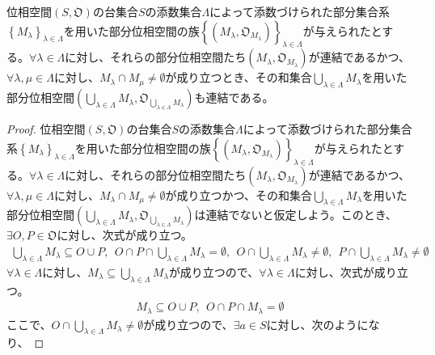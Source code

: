 \documentclass[dvipdfmx]{jsarticle}
\begin{document}
\begin{thm}\label{8.1.5.6}
位相空間$\left( S,\mathfrak{O} \right)$の台集合$S$の添数集合$\varLambda$によって添数づけられた部分集合系$\left\{ M_{\lambda} \right\}_{\lambda \in \varLambda}$を用いた部分位相空間の族$\left\{ \left( M_{\lambda},\mathfrak{O}_{M_{\lambda}} \right) \right\}_{\lambda \in \varLambda}$が与えられたとする。$\forall\lambda \in \varLambda$に対し、それらの部分位相空間たち$\left( M_{\lambda},\mathfrak{O}_{M_{\lambda}} \right)$が連結であるかつ、$\forall\lambda,\mu \in \varLambda$に対し、$M_{\lambda} \cap M_{\mu} \neq \emptyset$が成り立つとき、その和集合$\bigcup_{\lambda \in \varLambda} M_{\lambda}$を用いた部分位相空間$\left( \bigcup_{\lambda \in \varLambda} M_{\lambda},\mathfrak{O}_{\bigcup_{\lambda \in \varLambda} M_{\lambda}} \right)$も連結である。
\end{thm}
\begin{proof}
位相空間$\left( S,\mathfrak{O} \right)$の台集合$S$の添数集合$\varLambda$によって添数づけられた部分集合系$\left\{ M_{\lambda} \right\}_{\lambda \in \varLambda}$を用いた部分位相空間の族$\left\{ \left( M_{\lambda},\mathfrak{O}_{M_{\lambda}} \right) \right\}_{\lambda \in \varLambda}$が与えられたとする。$\forall\lambda \in \varLambda$に対し、それらの部分位相空間たち$\left( M_{\lambda},\mathfrak{O}_{M_{\lambda}} \right)$が連結であるかつ、$\forall\lambda,\mu \in \varLambda$に対し、$M_{\lambda} \cap M_{\mu} \neq \emptyset$が成り立つかつ、その和集合$\bigcup_{\lambda \in \varLambda} M_{\lambda}$を用いた部分位相空間$\left( \bigcup_{\lambda \in \varLambda} M_{\lambda},\mathfrak{O}_{\bigcup_{\lambda \in \varLambda} M_{\lambda}} \right)$は連結でないと仮定しよう。このとき、$\exists O,P \in \mathfrak{O}$に対し、次式が成り立つ。
\begin{align*}
\bigcup_{\lambda \in \varLambda} M_{\lambda} \subseteq O \cup P,\ \ O \cap P \cap \bigcup_{\lambda \in \varLambda} M_{\lambda} = \emptyset,\ \ O \cap \bigcup_{\lambda \in \varLambda} M_{\lambda} \neq \emptyset,\ \ P \cap \bigcup_{\lambda \in \varLambda} M_{\lambda} \neq \emptyset
\end{align*}
$\forall\lambda \in \varLambda$に対し、$M_{\lambda} \subseteq \bigcup_{\lambda \in \varLambda} M_{\lambda}$が成り立つので、$\forall\lambda \in \varLambda$に対し、次式が成り立つ。
\begin{align*}
M_{\lambda} \subseteq O \cup P,\ \ O \cap P \cap M_{\lambda} = \emptyset
\end{align*}
ここで、$O \cap \bigcup_{\lambda \in \varLambda} M_{\lambda} \neq \emptyset$が成り立つので、$\exists a \in S$に対し、次のようになり、

\end{proof}
\end{document}
